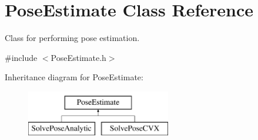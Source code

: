 \hypertarget{classPoseEstimate}{\section{\-Pose\-Estimate \-Class \-Reference}
\label{classPoseEstimate}
}


\-Class for performing pose estimation.  




{\ttfamily \#include $<$\-Pose\-Estimate.\-h$>$}

\-Inheritance diagram for \-Pose\-Estimate\-:\begin{figure}[H]
\begin{center}
\leavevmode
\includegraphics[height=2.000000cm]{classPoseEstimate}
\end{center}
\end{figure}
